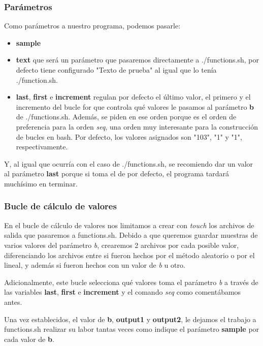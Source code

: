 \documentclass[a4paper, 11pt]{article}
\begin{document}
		\subsubsection{Parámetros}
			Como parámetros a nuestro programa, podemos pasarle:
			\begin{itemize}
				\item \textbf{sample}
				
				\item \textbf{text} que será un parámetro que pasaremos directamente a ./functions.sh, por defecto tiene
				configurado "Texto de prueba" al igual que lo tenía ./function.sh.

				\item \textbf{last}, \textbf{first} e \textbf{increment} regulan por defecto el último valor, el primero y
				el incremento del bucle for que controla qué valores le pasamos al parámetro \textbf{b} de ./functions.sh.
				Además, se piden en ese orden porque es el orden de preferencia para la orden \textit{seq}, una orden muy
				interesante para la construcción de bucles en bash. Por defecto, los valores asignados son "103", "1" y
				"1", respectivamente.
			\end{itemize}
			
			Y, al igual que ocurría con el caso de ./functions.sh, se recomiendo dar un valor al parámetro \textbf{last}
			porque si toma el de por defecto, el programa tardará muchísimo en terminar.
			
		\subsubsection{Bucle de cálculo de valores}
			En el bucle de cálculo de valores nos limitamos a crear con \textit{touch} los archivos de salida que pasaremos
			a functions.sh. Debido a que queremos guardar muestras de varios valores del parámetro \textit{b}, crearemos
			2 archivos por cada posible valor, diferenciando los archivos entre si fueron hechos por el método aleatorio
			o por el lineal, y además si fueron hechos con un valor de \textit{b} u otro.
			
			Adicionalmente, este bucle selecciona qué valores toma el parámetro \textit{b} a través de las variables
			\textbf{last}, \textbf{first} e \textbf{increment} y el comando \textit{seq} como comentábamos antes.
			
			Una vez establecidos, el valor de \textbf{b}, \textbf{output1} y \textbf{output2}, le dejamos el trabajo a
			functions.sh realizar su labor tantas veces como indique el parámetro \textbf{sample} por cada valor de
			\textbf{b}.
		
\end{document}
